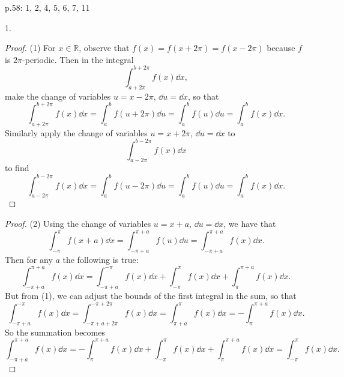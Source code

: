 \documentclass[11pt]{article}
\begin{document}
p.58: 1, 2, 4, 5, 6, 7, 11

1. \begin{proof}
    (1) For $x\in\mathbb{R}$, observe that $f(x) = f(x+2\pi) = f(x-2\pi)$ because $f$ is $2\pi$-periodic. Then in the integral \[\int_{a+2\pi}^{b+2\pi}f(x)\dd{x},\] make the change of variables $u = x-2\pi$, $\dd{u}= \dd{x}$, so that \[\int_{a+2\pi}^{b+2\pi}f(x)\dd{x} = \int_a^b f(u+2\pi)\dd{u} = \int_a^b f(u)\dd{u} = \int_a^b f(x)\dd{x}.\] Similarly apply the change of variables $u = x+2\pi$, $\dd{u}= \dd{x}$ to \[\int_{a-2\pi}^{b-2\pi}f(x)\dd{x}\] to find \[\int_{a-2\pi}^{b-2\pi}f(x)\dd{x} = \int_a^b f(u-2\pi)\dd{u} = \int_a^b f(u)\dd{u} = \int_a^bf(x)\dd{x}.\]
\end{proof} \begin{proof}
    (2) Using the change of variables $u = x+a$, $\dd{u} = \dd{x}$, we have that \[\int_{-\pi}^{\pi}f(x+a)\dd{x} = \int_{-\pi+a}^{\pi+a}f(u)\dd{u} = \int_{-\pi+a}^{\pi+a}f(x)\dd{x}.\] Then for any $a$ the following is true: \[\int_{-\pi+a}^{\pi+a}f(x)\dd{x} = \int_{-\pi+a}^{-\pi}f(x)\dd{x} + \int_{-\pi}^{\pi}f(x)\dd{x} + \int_{\pi}^{\pi+a}f(x)\dd{x}.\] But from (1), we can adjust the bounds of the first integral in the sum, so that \[\int_{-\pi+a}^{-\pi}f(x)\dd{x} = \int_{-\pi+a+2\pi}^{-\pi+2\pi}f(x)\dd{x} = \int_{\pi+a}^{\pi}f(x)\dd{x} = -\int_{\pi}^{\pi+a}f(x)\dd{x}.\] So the summation becomes \[\int_{-\pi+a}^{\pi+a}f(x)\dd{x} = -\int_{\pi}^{\pi+a}f(x)\dd{x} + \int_{-\pi}^{\pi}f(x)\dd{x} + \int_{\pi}^{\pi+a}f(x)\dd{x} = \int_{-\pi}^{\pi}f(x)\dd{x}.\]
\end{proof}
\end{document}
